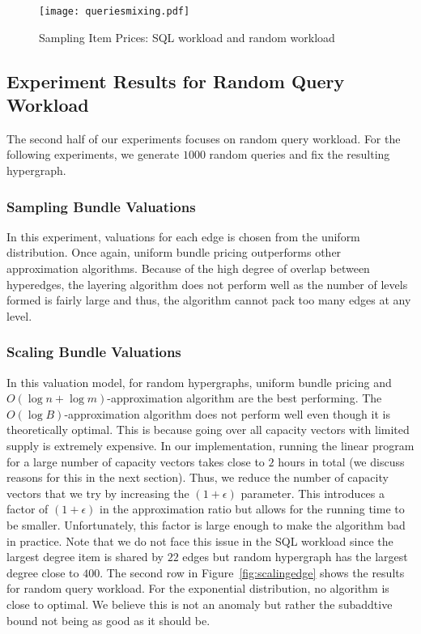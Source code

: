 \begin{figure}[!t]
	\centering
	\texttt{[image: queriesmixing.pdf]}
	\caption{Sampling Item Prices: SQL workload and random workload} \label{fig:mixing}
\end{figure}  

\subsection{Experiment Results for Random Query Workload}


The second half of our experiments focuses on random query workload. For the following experiments, we generate $1000$ random queries and fix the resulting hypergraph. 

\subsubsection{Sampling Bundle Valuations}

In this experiment, valuations for each edge is chosen from the uniform distribution. Once again, uniform bundle pricing outperforms other approximation algorithms. Because of the high degree of overlap between hyperedges, the layering algorithm does not perform well as the number of levels formed is fairly large and thus, the algorithm cannot pack too many edges at any level.

\subsubsection{Scaling Bundle Valuations} In this valuation model, for random hypergraphs, uniform bundle pricing and $O(\log n+\log m)$-approximation algorithm are the best performing. The $O(\log B)$-approximation algorithm does not perform well even though it is theoretically optimal. This is because going over all capacity vectors with limited supply is extremely expensive. In our implementation, running the linear program for a large number of capacity vectors takes close to $2$ hours in total (we discuss reasons for this in the next section). Thus, we reduce the number of capacity vectors that we try by increasing the $(1+\epsilon)$ parameter. This introduces a factor of $(1+\epsilon)$ in the approximation ratio but allows for the running time to be smaller. Unfortunately, this factor is large enough to make the algorithm bad in practice. Note that we do not face this issue in the SQL workload since the largest degree item is shared by $22$ edges but random hypergraph has the largest degree close to $400$. The second row in Figure~\ref{fig:scalingedge} shows the results for random query workload. For the exponential distribution, no algorithm is close to optimal. We believe this is not an anomaly but rather the subaddtive bound not being as good as it should be.

